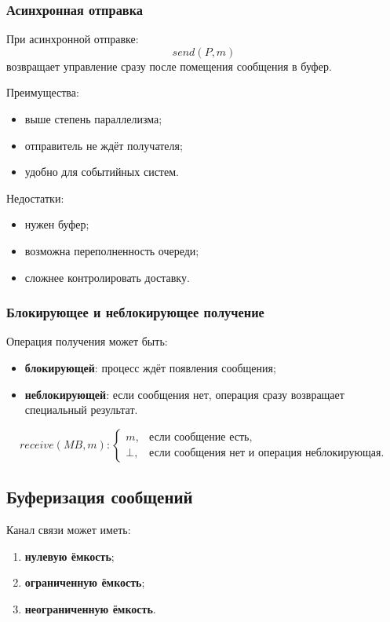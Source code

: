\documentclass[12pt,a4paper]{article}
\begin{document}
\subsubsection{Асинхронная отправка}

При асинхронной отправке:
\[
send(P, m)
\]
возвращает управление сразу после помещения сообщения в буфер.

Преимущества:
\begin{itemize}
    \item выше степень параллелизма;
    \item отправитель не ждёт получателя;
    \item удобно для событийных систем.
\end{itemize}

Недостатки:
\begin{itemize}
    \item нужен буфер;
    \item возможна переполненность очереди;
    \item сложнее контролировать доставку.
\end{itemize}

\subsubsection{Блокирующее и неблокирующее получение}

Операция получения может быть:
\begin{itemize}
    \item \textbf{блокирующей}: процесс ждёт появления сообщения;
    \item \textbf{неблокирующей}: если сообщения нет, операция сразу возвращает специальный результат.
\end{itemize}

\[
receive(MB, m):
\begin{cases}
m, & \text{если сообщение есть},\\
\bot, & \text{если сообщения нет и операция неблокирующая}.
\end{cases}
\]

\subsection{Буферизация сообщений}

Канал связи может иметь:
\begin{enumerate}
    \item \textbf{нулевую ёмкость};
    \item \textbf{ограниченную ёмкость};
    \item \textbf{неограниченную ёмкость}.
\end{enumerate}
\end{document}
